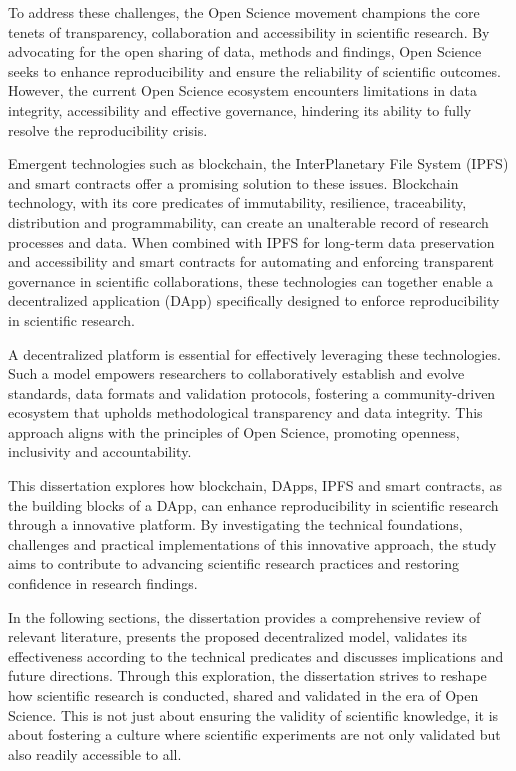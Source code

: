 To address these challenges, the Open Science movement champions the core tenets of transparency, collaboration and accessibility in scientific research. By advocating for the open sharing of data, methods and findings, Open Science seeks to enhance reproducibility and ensure the reliability of scientific outcomes. However, the current Open Science ecosystem encounters limitations in data integrity, accessibility and effective governance, hindering its ability to fully resolve the reproducibility crisis.

Emergent technologies such as blockchain, the InterPlanetary File System (IPFS) and smart contracts offer a promising solution to these issues. Blockchain technology, with its core predicates of immutability, resilience, traceability, distribution and programmability, can create an unalterable record of research processes and data. When combined with IPFS for long-term data preservation and accessibility and smart contracts for automating and enforcing transparent governance in scientific collaborations, these technologies can together enable a decentralized application (DApp) specifically designed to enforce reproducibility in scientific research.

A decentralized platform is essential for effectively leveraging these technologies. Such a model empowers researchers to collaboratively establish and evolve standards, data formats and validation protocols, fostering a community-driven ecosystem that upholds methodological transparency and data integrity. This approach aligns with the principles of Open Science, promoting openness, inclusivity and accountability.

This dissertation explores how blockchain, DApps, IPFS and smart contracts, as the building blocks of a DApp, can enhance reproducibility in scientific research through a innovative platform. By investigating the technical foundations, challenges and practical implementations of this innovative approach, the study aims to contribute to advancing scientific research practices and restoring confidence in research findings.

In the following sections, the dissertation provides a comprehensive review of relevant literature, presents the proposed decentralized model, validates its effectiveness according to the technical predicates and discusses implications and future directions. Through this exploration, the dissertation strives to reshape how scientific research is conducted, shared and validated in the era of Open Science. This is not just about ensuring the validity of scientific knowledge, it is about fostering a culture where scientific experiments are not only validated but also readily accessible to all.
